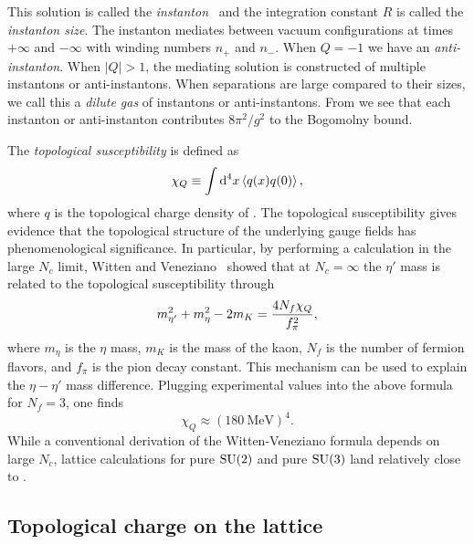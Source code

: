 This solution is called the {\it instanton}~\cite{belavin_pseudoparticle_1975}
and the integration constant $R$ is called the 
{\it instanton size}. 
The instanton mediates between vacuum configurations at times
$+\infty$ and $-\infty$ with winding numbers $n_+$ and $n_-$.
When $Q=-1$ we have an {\it anti-instanton}.
When $|Q|>1$, the mediating solution is constructed of multiple 
instantons or anti-instantons. When separations are large compared
to their sizes, we call this a {\it dilute gas} of instantons
or anti-instantons. From 
we see that each instanton or anti-instanton contributes
$8\pi^2/g^2$ to the Bogomolny bound.

The {\it topological susceptibility} is defined as
\begin{equation}
  \chi_Q\equiv\int\dd[4]{x}\ev{q(x)q(0)},
\end{equation}
where $q$ is the topological charge density of .
The topological susceptibility gives evidence that the topological
structure of the underlying gauge fields has phenomenological significance.
In particular, by performing a calculation in the large $N_c$ limit, 
Witten and Veneziano~\cite{witten_current_1979,veneziano_u1_1979} showed
that at $N_c=\infty$ the $\eta'$ mass is related to 
the topological susceptibility through
\begin{equation}\index{Witten-Veneziano formula}
  m_{\eta'}^2+m_\eta^2-2m_K=\frac{4N_f\chi_Q}{f_\pi^2},
\end{equation}
where $m_\eta$ is the $\eta$ mass, $m_K$ is the mass of the kaon, 
$N_f$ is the number of fermion flavors, and $f_\pi$ is the
pion decay constant. This mechanism can be used to explain the 
$\eta-\eta'$ mass difference. 
Plugging experimental values into the above
formula for $N_f=3$, one finds
\begin{equation}\label{eq:chivalue}
  \chi_Q\approx(180~\text{MeV})^4.
\end{equation}
While a conventional derivation of the Witten-Veneziano formula depends
on large $N_c$, lattice calculations for pure $\operatorname{SU}(2)$ and
pure $\operatorname{SU}(3)$ land relatively close to .

\subsection{Topological charge on the lattice}


